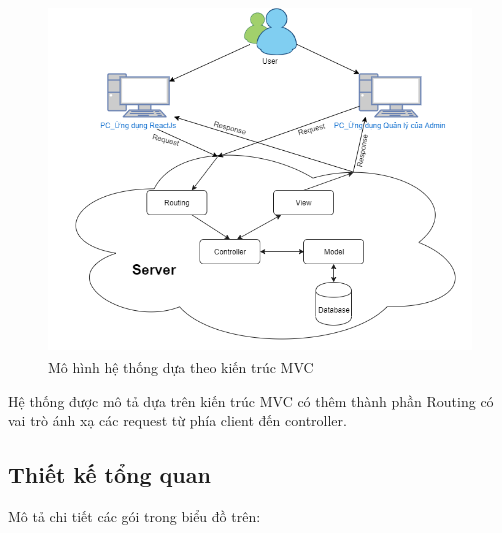 \documentclass[../DoAn.tex]{subfiles}
\begin{document}
\begin{figure}[H]
    \centering
    \includegraphics[width=0.75\linewidth,height=9.22cm]{Hinhve/server.png}
    \caption{Mô hình hệ thống dựa theo kiến trúc MVC}
    \label{fig:Fig42}
\end{figure}
Hệ thống được mô tả dựa trên kiến trúc MVC có thêm thành phần Routing có vai trò ánh xạ các request từ phía client đến controller.
\newpage
\subsection{Thiết kế tổng quan}
Mô tả chi tiết các gói trong biểu đồ trên:
\end{document}
